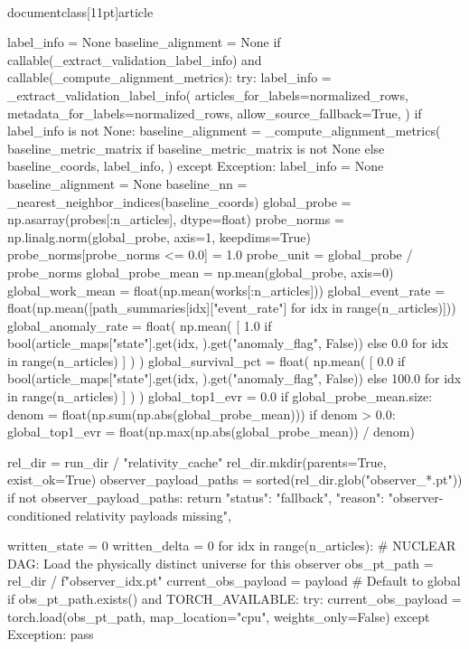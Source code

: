 \\documentclass[11pt]{article}
\begin{document}
\begin{CodeBlock}
    label_info = None
    baseline_alignment = None
    if callable(_extract_validation_label_info) and callable(_compute_alignment_metrics):
        try:
            label_info = _extract_validation_label_info(
                articles_for_labels=normalized_rows,
                metadata_for_labels=normalized_rows,
                allow_source_fallback=True,
            )
            if label_info is not None:
                baseline_alignment = _compute_alignment_metrics(
                    baseline_metric_matrix if baseline_metric_matrix is not None else baseline_coords,
                    label_info,
                )
        except Exception:
            label_info = None
            baseline_alignment = None
    baseline_nn = _nearest_neighbor_indices(baseline_coords)
    global_probe = np.asarray(probes[:n_articles], dtype=float)
    probe_norms = np.linalg.norm(global_probe, axis=1, keepdims=True)
    probe_norms[probe_norms <= 0.0] = 1.0
    probe_unit = global_probe / probe_norms
    global_probe_mean = np.mean(global_probe, axis=0)
    global_work_mean = float(np.mean(works[:n_articles]))
    global_event_rate = float(np.mean([path_summaries[idx]["event_rate"] for idx in range(n_articles)]))
    global_anomaly_rate = float(
        np.mean(
            [
                1.0 if bool(article_maps["state"].get(idx, {}).get("anomaly_flag", False)) else 0.0
                for idx in range(n_articles)
            ]
        )
    )
    global_survival_pct = float(
        np.mean(
            [
                0.0 if bool(article_maps["state"].get(idx, {}).get("anomaly_flag", False)) else 100.0
                for idx in range(n_articles)
            ]
        )
    )
    global_top1_evr = 0.0
    if global_probe_mean.size:
        denom = float(np.sum(np.abs(global_probe_mean)))
        if denom > 0.0:
            global_top1_evr = float(np.max(np.abs(global_probe_mean)) / denom)

    rel_dir = run_dir / "relativity_cache"
    rel_dir.mkdir(parents=True, exist_ok=True)
    observer_payload_paths = sorted(rel_dir.glob("observer_*.pt"))
    if not observer_payload_paths:
        return {
            "status": "fallback",
            "reason": "observer-conditioned relativity payloads missing",
        }

    written_state = 0
    written_delta = 0
    for idx in range(n_articles):
        # NUCLEAR DAG: Load the physically distinct universe for this observer
        obs_pt_path = rel_dir / f"observer_{idx}.pt"
        current_obs_payload = payload  # Default to global
        if obs_pt_path.exists() and TORCH_AVAILABLE:
            try:
                current_obs_payload = torch.load(obs_pt_path, map_location="cpu", weights_only=False)
            except Exception:
                pass
        

\end{CodeBlock}
\end{document}
